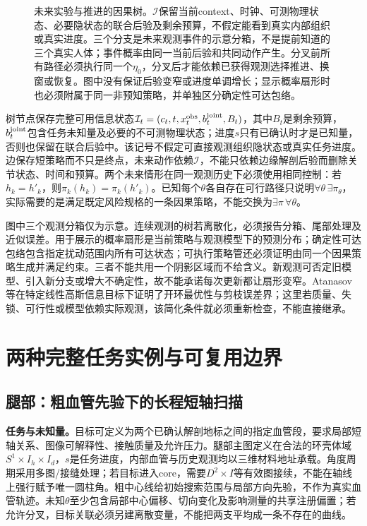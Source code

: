 \documentclass[11pt,a4paper]{article}
\numberwithin{equation}{section}
\theoremstyle{definition}
\begin{document}
\begin{figure}[tbp]
\caption{未来实验与推进的因果树。$\mathcal I$保留当前context、时钟、可测物理状态、必要隐状态的联合后验及剩余预算，不假定能看到真实内部组织或真实进度。三个分支是未来观测事件的示意分箱，不是提前知道的三个真实人体；事件概率由同一当前后验和共同动作产生。分叉前所有路径必须执行同一个$\eta_0$，分叉后才能依赖已获得观测选择推进、换窗或恢复。图中没有保证后验变窄或进度单调增长；显示概率扇形时也必须附属于同一非预知策略，并单独区分确定性可达包络。}
\label{graph:fig:tree}
\end{figure}


树节点保存完整可用信息状态$\mathcal I_t=(c_t,t,x_t^{\rm obs},b_t^{\rm joint},B_t)$，其中$B_t$是剩余预算，$b_t^{\rm joint}$包含任务未知量及必要的不可测物理状态；进度$s$只有已确认时才是已知量，否则也保留在联合后验中。该记号不假定可直接观测组织隐状态或真实任务进度。边保存短策略而不只是终点，未来动作依赖$\mathcal I$，不能只依赖边缘解剖后验而删除关节状态、时间和预算。两个未来情形在同一观测历史下必须使用相同控制：若$h_k=h'_k$，则$\pi_k(h_k)=\pi_k(h'_k)$。已知每个$\theta$各自存在可行路径只说明$\forall\theta\,\exists\pi_\theta$，实际需要的是满足既定风险规格的一条因果策略，不能交换为$\exists\pi\,\forall\theta$。

图中三个观测分箱仅为示意。连续观测的树若离散化，必须报告分箱、尾部处理及近似误差。用于展示的概率扇形是当前策略与观测模型下的预测分布；确定性可达包络包含指定扰动范围内所有可达状态；可执行策略管还必须证明由同一个因果策略生成并满足约束。三者不能共用一个阴影区域而不给含义。新观测可否定旧模型、引入新分支或增大不确定性，故不能承诺每次更新都让扇形变窄。Atanasov等在特定线性高斯信息目标下证明了开环最优性与剪枝误差界\cite{atanasov2014}；这里若质量、失锁、可行性或模型依赖实际观测，该简化条件就必须重新检查，不能直接继承。

\section{两种完整任务实例与可复用边界}
\label{graph:sec:examples}

\subsection{腿部：粗血管先验下的长程短轴扫描}

\textbf{任务与未知量。}目标可定义为两个已确认解剖地标之间的指定血管段，要求局部短轴关系、图像可解释性、接触质量及允许压力。腿部主图定义在合法的环壳体域$S^1\times I_h\times I_d$，$s$是任务进度，内部血管与历史观测均以三维材料地址承载。角度周期采用多图/接缝处理；若目标进入core，需要$D^2\times I$等有效图接续，不能在轴线上强行赋予唯一圆柱角。粗中心线给初始搜索范围与局部方向先验，不作为真实血管轨迹。未知$\theta$至少包含局部中心偏移、切向变化及影响测量的共享注册偏置；若允许分叉，目标关联必须另建离散变量，不能把两支平均成一条不存在的曲线。
\end{document}
